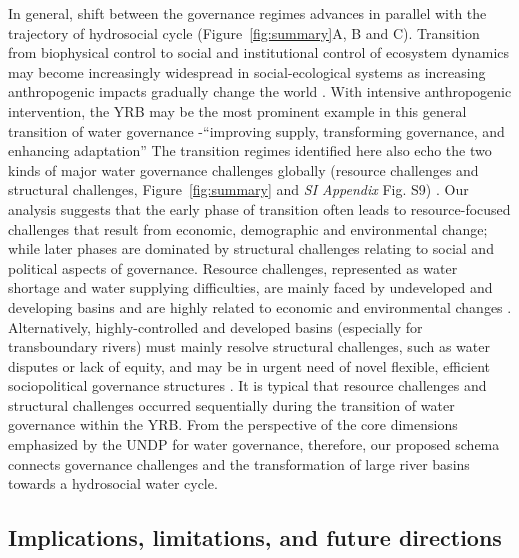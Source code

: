 In general, shift between the governance regimes advances in parallel with the trajectory of hydrosocial cycle (Figure~\ref{fig:summary}A, B and C).
Transition from biophysical control to social and institutional control of ecosystem dynamics may become increasingly widespread in social-ecological systems as increasing anthropogenic impacts gradually change the world
\cite{bestPaceHumanInducedChange2020,cummingLinkingeconomicgrowth2018,cummingImplicationsagriculturaltransitions2014}.
With intensive anthropogenic intervention, the YRB may be the most prominent example in this general transition of water governance -``improving supply, transforming governance, and enhancing adaptation'' %
The transition regimes identified here also echo the two kinds of major water governance challenges globally (resource challenges and structural challenges, Figure~\ref{fig:summary} and \textit{SI Appendix} Fig. S9)
\cite{singhWaterGovernanceChallenges2019,porcherFacingChallengesWater2019}.
Our analysis suggests that the early phase of transition often leads to resource-focused challenges that result from economic, demographic and environmental change; while later phases are dominated by structural challenges relating to social and political aspects of governance.
Resource challenges, represented as water shortage and water supplying difficulties, are mainly faced by undeveloped and developing basins and are highly related to economic and environmental changes
\cite{allanNavigatingcomplexitiescoordinated2019,florkeWatercompetitioncities2018,liuWaterSustainabilityChina2012}.
Alternatively, highly-controlled and developed basins (especially for transboundary rivers) must mainly resolve structural challenges, such as water disputes or lack of equity, and may be in urgent need of novel flexible, efficient sociopolitical governance structures %
\cite{kitroeffThisWarCrossBorder2020,kitroeffThisWarCrossBorder2020,roobavannanRoleSectoralTransformation2017,unep-dhiTransboundaryRiverBasins2016}.
It is typical that resource challenges and structural challenges occurred sequentially during the transition of water governance within the YRB.
From the perspective of the core dimensions emphasized by the UNDP for water governance, therefore, our proposed schema connects governance challenges and the transformation of large river basins towards a hydrosocial water cycle.

\subsection{Implications, limitations, and future directions}
\label{Outlook}

